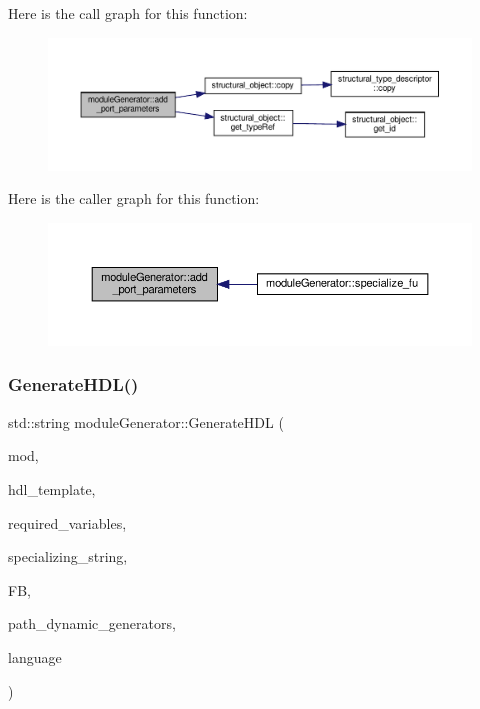 Here is the call graph for this function\+:
\nopagebreak
\begin{figure}[H]
\begin{center}
\leavevmode
\includegraphics[width=350pt]{d4/d94/classmoduleGenerator_a5dde4d1e5f2526b1fdd1edab7777a475_cgraph}
\end{center}
\end{figure}
Here is the caller graph for this function\+:
\nopagebreak
\begin{figure}[H]
\begin{center}
\leavevmode
\includegraphics[width=350pt]{d4/d94/classmoduleGenerator_a5dde4d1e5f2526b1fdd1edab7777a475_icgraph}
\end{center}
\end{figure}
\mbox{\label{classmoduleGenerator_a15676d465d1356f46bb9d60cfdb4e730}} 
\subsubsection{\texorpdfstring{Generate\+H\+D\+L()}{GenerateHDL()}}
{\footnotesize\ttfamily std\+::string module\+Generator\+::\+Generate\+H\+DL (\begin{DoxyParamCaption}\item[{const \hyperlink{classmodule}{module} $\ast$}]{mod,  }\item[{const std\+::string \&}]{hdl\+\_\+template,  }\item[{std\+::vector$<$ std\+::tuple$<$ unsigned int, unsigned int $>$$>$ \&}]{required\+\_\+variables,  }\item[{const std\+::string \&}]{specializing\+\_\+string,  }\item[{const \hyperlink{function__behavior_8hpp_a94872da12ed056b6ecf90456164e0213}{Function\+Behavior\+Const\+Ref}}]{FB,  }\item[{const std\+::string \&}]{path\+\_\+dynamic\+\_\+generators,  }\item[{\hyperlink{language__writer_8hpp_a890069761ca3ce361c42684c789d886c}{H\+D\+L\+Writer\+\_\+\+Language}}]{language }\end{DoxyParamCaption})}



